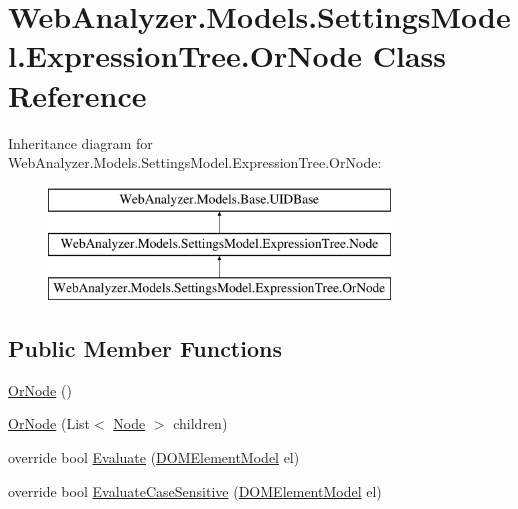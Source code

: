 \hypertarget{class_web_analyzer_1_1_models_1_1_settings_model_1_1_expression_tree_1_1_or_node}{}\section{Web\+Analyzer.\+Models.\+Settings\+Model.\+Expression\+Tree.\+Or\+Node Class Reference}
\label{class_web_analyzer_1_1_models_1_1_settings_model_1_1_expression_tree_1_1_or_node}
Inheritance diagram for Web\+Analyzer.\+Models.\+Settings\+Model.\+Expression\+Tree.\+Or\+Node\+:\begin{figure}[H]
\begin{center}
\leavevmode
\includegraphics[height=3.000000cm]{class_web_analyzer_1_1_models_1_1_settings_model_1_1_expression_tree_1_1_or_node}
\end{center}
\end{figure}
\subsection*{Public Member Functions}
\begin{DoxyCompactItemize}
\item 
\hyperlink{class_web_analyzer_1_1_models_1_1_settings_model_1_1_expression_tree_1_1_or_node_ae26128547f197be9bd160acdb9f69813}{Or\+Node} ()
\item 
\hyperlink{class_web_analyzer_1_1_models_1_1_settings_model_1_1_expression_tree_1_1_or_node_aa5d39bf2c74238c099d469f14a753335}{Or\+Node} (List$<$ \hyperlink{class_web_analyzer_1_1_models_1_1_settings_model_1_1_expression_tree_1_1_node}{Node} $>$ children)
\item 
override bool \hyperlink{class_web_analyzer_1_1_models_1_1_settings_model_1_1_expression_tree_1_1_or_node_a3dd522940f332bd171c0db7a8b30f0a7}{Evaluate} (\hyperlink{class_web_analyzer_1_1_models_1_1_data_model_1_1_d_o_m_element_model}{D\+O\+M\+Element\+Model} el)
\item 
override bool \hyperlink{class_web_analyzer_1_1_models_1_1_settings_model_1_1_expression_tree_1_1_or_node_a690c9013ec5f46532bce12fd221f4f77}{Evaluate\+Case\+Sensitive} (\hyperlink{class_web_analyzer_1_1_models_1_1_data_model_1_1_d_o_m_element_model}{D\+O\+M\+Element\+Model} el)
\end{DoxyCompactItemize}
